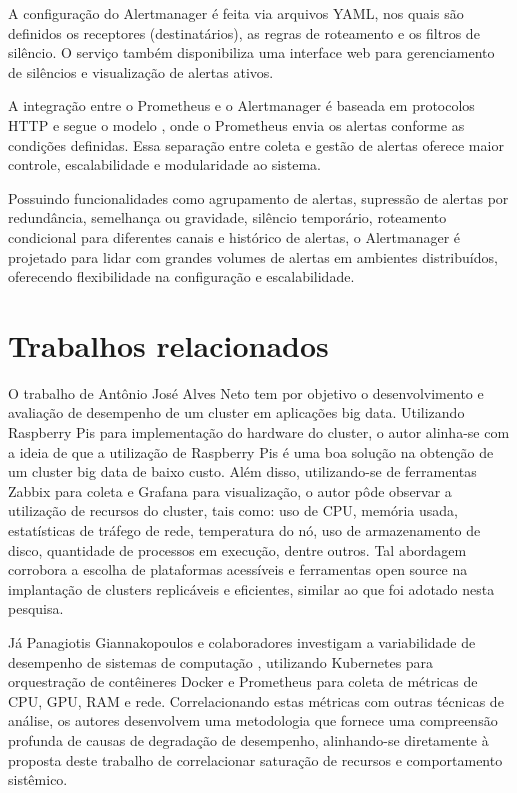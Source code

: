 A configuração do Alertmanager é feita via arquivos YAML, nos quais são definidos os receptores (destinatários), as regras de roteamento e os filtros de silêncio. O serviço também disponibiliza uma interface web para gerenciamento de silêncios e visualização de alertas ativos.

A integração entre o Prometheus e o Alertmanager é baseada em protocolos HTTP e segue o modelo , onde o Prometheus envia os alertas conforme as condições definidas. Essa separação entre coleta e gestão de alertas oferece maior controle, escalabilidade e modularidade ao sistema.

Possuindo funcionalidades como agrupamento de alertas, supressão de alertas por redundância, semelhança ou gravidade, silêncio temporário, roteamento condicional para diferentes canais e histórico de alertas, o Alertmanager  é projetado para lidar com grandes volumes de alertas em ambientes distribuídos, oferecendo flexibilidade na configuração e escalabilidade.

\section{Trabalhos relacionados}
\label{section:TrabalhosRelacionados}

O trabalho de Antônio José Alves Neto \citep{alvesneto2023} tem por objetivo o desenvolvimento e avaliação de desempenho de um cluster em aplicações big data. Utilizando Raspberry Pis para implementação do hardware do cluster, o autor alinha-se com a ideia de que a utilização de Raspberry Pis é uma boa solução na obtenção de um cluster big data de baixo custo. Além disso, utilizando-se de ferramentas Zabbix para coleta e Grafana para visualização, o autor pôde observar a utilização de recursos do cluster, tais como: uso de CPU, memória usada, estatísticas de tráfego de rede, temperatura do nó, uso de armazenamento de disco, quantidade de processos em execução, dentre outros. Tal abordagem corrobora a escolha de plataformas acessíveis e ferramentas open source na implantação de clusters replicáveis e eficientes, similar ao que foi adotado nesta pesquisa.

Já Panagiotis Giannakopoulos e colaboradores \citep{panagiotis2025} investigam a variabilidade de desempenho de sistemas de computação , utilizando Kubernetes para orquestração de contêineres Docker e Prometheus para coleta de métricas de CPU, GPU, RAM e rede. Correlacionando estas métricas com outras técnicas de análise, os autores desenvolvem uma metodologia que fornece uma compreensão profunda de causas de degradação de desempenho, alinhando-se diretamente à proposta deste trabalho de correlacionar saturação de recursos e comportamento sistêmico.

